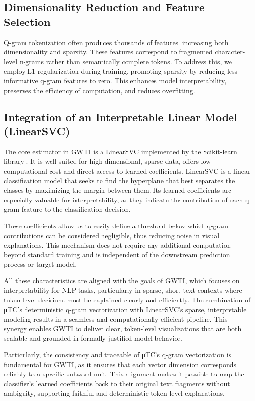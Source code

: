 \documentclass[runningheads,10pt]{llncs}
\begin{document}
\subsection{Dimensionality Reduction and Feature Selection}

Q-gram tokenization often produces thousands of features, increasing both dimensionality and sparsity. These features correspond to fragmented character-level n-grams rather than semantically complete tokens. To address this, we employ L1 regularization during training, promoting sparsity by reducing less informative q-gram features to zero. This enhances model interpretability, preserves the efficiency of computation, and reduces overfitting.

\subsection{Integration of an Interpretable Linear Model (LinearSVC)}

The core estimator in \ac{GWTI} is a \ac{LinearSVC} implemented by the Scikit-learn library \cite{scikit-learn}. It is well-suited for high-dimensional, sparse data, offers low computational cost and direct access to learned coefficients. \ac{LinearSVC} is a linear classification model that seeks to find the hyperplane that best separates the classes by maximizing the margin between them. Its learned coefficients are especially valuable for interpretability, as they indicate the contribution of each q-gram feature to the classification decision.

These coefficients allow us to easily define a threshold below which q-gram contributions can be considered negligible, thus reducing noise in visual explanations. This mechanism does not require any additional computation beyond standard training and is independent of the downstream prediction process or target model.

All these characteristics are aligned with the goals of \ac{GWTI}, which focuses on interpretability for NLP tasks, particularly in sparse, short-text contexts where token-level decisions must be explained clearly and efficiently. The combination of μTC’s deterministic q-gram vectorization with LinearSVC’s sparse, interpretable modeling results in a seamless and computationally efficient pipeline. This synergy enables \ac{GWTI} to deliver clear, token-level visualizations that are both scalable and grounded in formally justified model behavior. 

Particularly, the consistency and traceable of μTC’s q-gram vectorization is fundamental for \ac{GWTI}, as it ensures that each vector dimension corresponds reliably to a specific subword unit. This alignment makes it possible to map the classifier’s learned coefficients back to their original text fragments without ambiguity, supporting faithful and deterministic token-level explanations.
\end{document}
